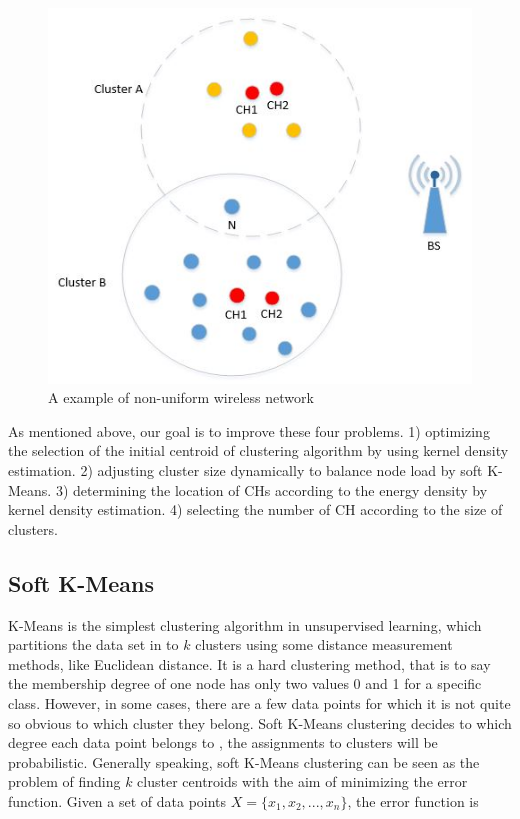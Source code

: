 \documentclass[11pt]{report}
\begin{document}
	\begin{figure}[!h]
		\centering
		\includegraphics[width=0.6\linewidth]{cha1.jpg}
		\caption{A example of non-uniform wireless network}
		\label{cha1}
	\end{figure}
    
    \noindent As mentioned above, our goal is to improve these four problems. 1) optimizing the selection of the initial centroid of clustering algorithm by using kernel density estimation. 2) adjusting cluster size dynamically to balance node load by soft K-Means. 3) determining the location of CHs according to the energy density by kernel density estimation. 4) selecting the number of CH according to the size of clusters.
    
    
	
	
	\subsection{Soft K-Means}
	\cite{report} K-Means is the simplest clustering algorithm in unsupervised learning, which partitions the data set in to $k$ clusters using some distance measurement methods, like Euclidean distance. It is a hard clustering method, that is to say the membership degree of one node has only two values 0 and 1 for a specific class. However, in some cases, there are a few data points for which it is not quite so obvious to which cluster they belong. Soft K-Means clustering decides to which degree each data point belongs to , the assignments to clusters will be probabilistic. Generally speaking, soft K-Means clustering can be seen as the problem of finding $k$ cluster centroids with the aim of minimizing the error function. Given a set of data points $X = \{x_1,x_2,...,x_n\}$, the error function is
	
\end{document}
